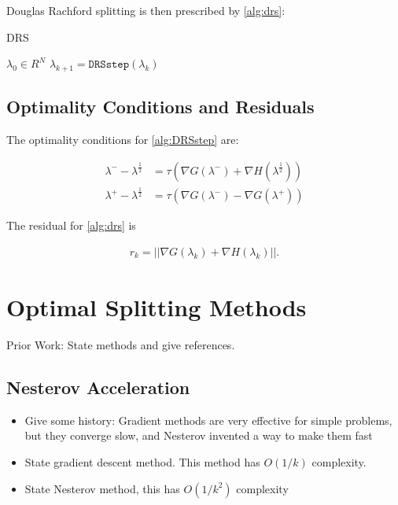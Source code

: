\documentclass[11pt]{article}
\newcommand{\half}{^{\frac 12}}
\newcommand{\plus}{^+}
\newcommand{\minus}{^-}
\def\grad {{\nabla}}
\begin{document}
\noindent Douglas Rachford splitting is then prescribed by
\cref{alg:drs}:

\begin{algorithm}[!]
\caption{DRS}
\label{alg:drs}
\begin{algorithmic}[1]
\REQUIRE $\lambda_0 \in R^N$
  \STATE $\lambda_{k+1} = \texttt{DRSstep}(\lambda_k)$
\ENDFOR
\end{algorithmic}
\end{algorithm}

\subsection{Optimality Conditions and Residuals}

The optimality conditions for \cref{alg:DRSstep} are:

\begin{align}
\lambda\minus - \lambda\half &= \tau \left(\grad G(\lambda\minus) + \grad H(\lambda\half) \right) \label{opt:drs:1}\\
\lambda\plus - \lambda\half &= \tau \left(\grad G(\lambda\minus) - \grad G(\lambda\plus)\right) \label{opt:drs:2}
\end{align}

\noindent The residual for \cref{alg:drs} is

\begin{align}
r_k = ||\grad G(\lambda_k) + \grad H(\lambda_k)|| \label{eq:res}.
\end{align}


\section{Optimal Splitting Methods}
Prior Work:  State methods and give references.

\subsection{Nesterov Acceleration}
\begin{itemize}
\item Give some history:  Gradient methods are very effective for simple problems, but they converge slow, and Nesterov invented a way to make them fast
\item State gradient descent method.  This method has $O(1/k)$ complexity.
\item State Nesterov method, this has $O(1/k^2)$ complexity
\end{itemize}
\end{document}
